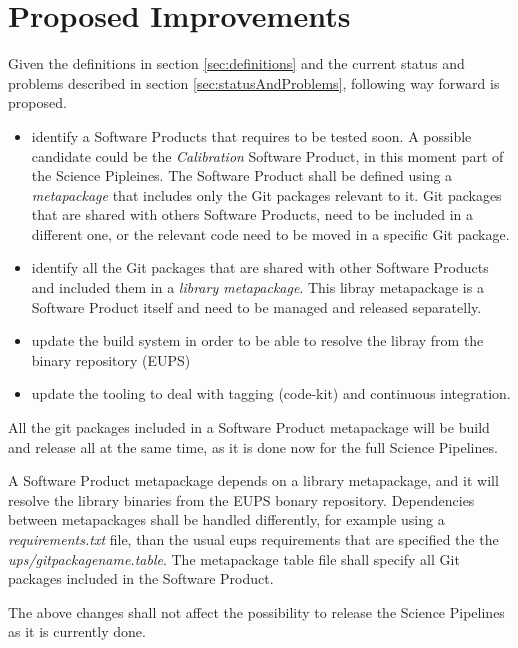 \newpage
\section{Proposed Improvements}\label{sec:proimp}

Given the definitions in section \ref{sec:definitions} and the current status and problems described in section \ref{sec:statusAndProblems}, following way forward is proposed.

\begin{itemize}
\item identify a Software Products that requires to be tested soon.
A possible candidate could be the \textit{Calibration} Software Product, in this moment part of the Science Pipleines. 
The Software Product shall be defined using a \textit{metapackage} that includes only the Git packages relevant to it.
Git packages that are shared with others Software Products, need to be included in a different one, or the relevant code need to be moved in a specific Git package.
\item identify all the Git packages that are shared with other Software Products and included them in a \textit{library metapackage}.
This libray metapackage is a Software Product itself and need to be managed and released separatelly.
\item update the build system in order to be able to resolve the libray from the binary repository (EUPS)
\item update the tooling to deal with tagging (code-kit) and continuous integration.
\end{itemize}

All the git packages included in a Software Product metapackage will be build and release all at the same time, as it is done now for the full Science Pipelines.

A Software Product metapackage depends on a library metapackage, and it will resolve the library binaries from the EUPS bonary repository.
Dependencies between metapackages shall be handled differently, for example using a \textit{requirements.txt} file, than the usual eups requirements that are specified the the \textit{ups/gitpackagename.table}.
The metapackage table file shall specify all Git packages included in the  Software Product.

The above changes shall not affect the possibility to release the Science Pipelines as it is currently done.

